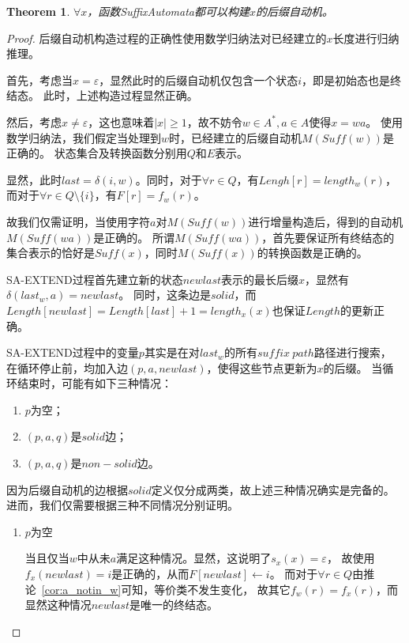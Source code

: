 \documentclass[UTF8]{ctexart}
\newtheorem{thm}{Theorem}[subsection]
\theoremstyle{definition}
\theoremstyle{remark}
\numberwithin{equation}{subsection}
\newcommand{\Suff}{\textit{Suff}}
\begin{document}
	\begin{thm}
	\label{thm:sam_build_right}
		$\forall x$，函数SuffixAutomata都可以构建$x$的后缀自动机。
	\end{thm}
	\begin{proof}
		后缀自动机构造过程的正确性使用数学归纳法对已经建立的$x$长度进行归纳推理。
		
		首先，考虑当$x = \varepsilon$，显然此时的后缀自动机仅包含一个状态$i$，即是初始态也是终结态。
		此时，上述构造过程显然正确。
		
		然后，考虑$x \neq \varepsilon$，这也意味着$|x| \ge 1$，故不妨令$w \in A^*, a \in A$使得$x = wa$。
		使用数学归纳法，我们假定当处理到$w$时，已经建立的后缀自动机$M(\Suff(w))$是正确的。
		状态集合及转换函数分别用$Q$和$E$表示。
		
		显然，此时$last = \delta(i,w)$。同时，对于$\forall r \in Q$，有$Lengh[r] = length_w(r)$，
		而对于$\forall r \in Q \setminus \{i\}$，有$F[r] = f_w(r)$。
		
		故我们仅需证明，当使用字符$a$对$M(\Suff(w))$进行增量构造后，得到的自动机$M(\Suff(wa))$是正确的。
		所谓$M(\Suff(wa))$，首先要保证所有终结态的集合表示的恰好是$\Suff(x)$，同时$M(\Suff(x))$的转换函数是正确的。
		
		SA-EXTEND过程首先建立新的状态$newlast$表示的最长后缀$x$，显然有$\delta(last_w, a) = newlast$。
		同时，这条边是$solid$，而$Length[newlast] = Length[last] + 1 = length_x(x)$也保证$Length$的更新正确。
		
		SA-EXTEND过程中的变量$p$其实是在对$last_w$的所有$suffix\ path$路径进行搜索，
		在循环停止前，均加入边$(p, a, newlast)$，使得这些节点更新为$x$的后缀。
		当循环结束时，可能有如下三种情况：
		\begin{enumerate}[(1)]
			\item $p$为空；
			\item $(p, a, q)$是$solid$边；
			\item $(p, a, q)$是$non-solid$边。
		\end{enumerate}
		
		因为后缀自动机的边根据$solid$定义仅分成两类，故上述三种情况确实是完备的。
		进而，我们仅需要根据三种不同情况分别证明。
		\begin{enumerate}
			\item $p$为空
			
			当且仅当$w$中从未$a$满足这种情况。显然，这说明了$s_x(x) = \varepsilon$，
			故使用$f_x(newlast) = i$是正确的，从而$F[newlast] \leftarrow i$。
			而对于$\forall r \in Q$由推论~\ref{cor:a_notin_w}可知，等价类不发生变化，
			故其它$f_w(r) = f_x(r)$，而显然这种情况$newlast$是唯一的终结态。
			

\end{enumerate}
\end{proof}
\end{document}
